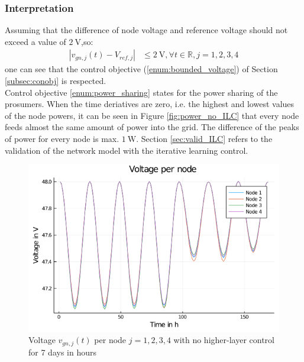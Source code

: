 \subsubsection*{Interpretation}
 Assuming that the difference of node voltage and reference voltage should not exceed a value of $\SI{2}{\volt}$,so:
\begin{align*}
|v_{gn,j}(t)-V_{ref,j}| &\leq \SI{2}{\volt}, \forall t \in \mathbb{R}, j=1,2,3,4
\end{align*}
one can see that the control objective (\ref{enum:bounded_voltage}) of Section \ref{subsec:conobj} is respected. 
\\Control objective \ref{enum:power_sharing} states for the power sharing of the prosumers. When the time deriatives are zero, i.e. the highest and lowest values of the node powers, it can be seen in Figure \ref{fig:power_no_ILC} that every node feeds almost the same amount of power into the grid. The difference of the peaks of power for every node is max. $\SI{1}{\watt}$. Section \ref{sec:valid_ILC} refers to the validation of the network model with the iterative learning control.
\begin{figure}[h]
	\centering
	\includegraphics[scale=0.45]{pictures/plots/DC_prosumer_no_ILC_voltage_per_node.png}
	\caption{Voltage $v_{gn,j}(t)$ per node $j=1,2,3,4$ with no higher-layer control for 7 days in hours}
	\label{fig:voltage_no_ILC}
\end{figure}
